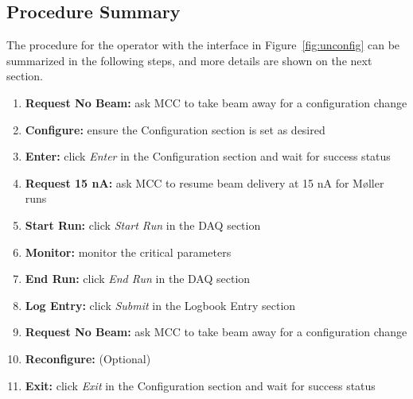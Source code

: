 \documentclass[amsmath,amssymb,notitlepage,12pt]{revtex4}
\begin{document}
\subsection{Procedure Summary}
The procedure for the operator with the interface in Figure~\ref{fig:unconfig} can be summarized in the following steps, and more details are shown on the next section.
\begin{enumerate}
\vspace{-4mm}\item {\bf Request No Beam:}  ask MCC to take beam away for a configuration change
\vspace{-4mm}\item {\bf Configure:}  ensure the Configuration section is set as desired
\vspace{-4mm}\item {\bf Enter:} click {\em Enter} in the Configuration section and wait for success status
\vspace{-4mm}\item {\bf Request 15 nA:} ask MCC to resume beam delivery at 15 nA for M{\o}ller runs
\vspace{-4mm}\item {\bf Start Run:} click {\em Start Run} in the DAQ section
\vspace{-4mm}\item {\bf Monitor:} monitor the critical parameters
\vspace{-4mm}\item {\bf End Run:} click {\em End Run} in the DAQ section
\vspace{-4mm}\item {\bf Log Entry:} click {\em Submit} in the Logbook Entry section 
\vspace{-4mm}\item {\bf Request No Beam:} ask MCC to take beam away for a configuration change
\vspace{-4mm}\item {\bf Reconfigure:} (Optional)
\vspace{-4mm}\item {\bf Exit:} click {\em Exit} in the Configuration section and wait for success status
\end{enumerate}
\end{document}
